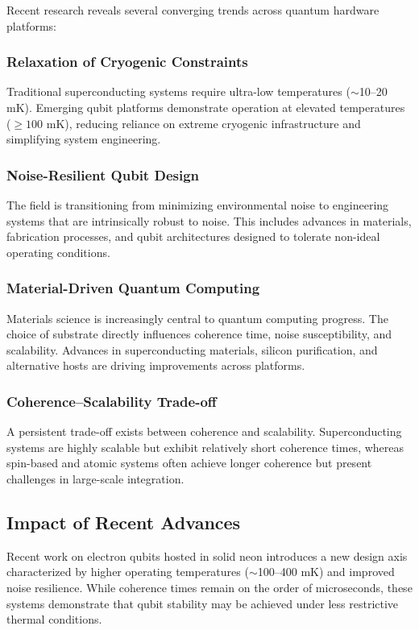\documentclass[11pt,a4paper]{article}
\begin{document}
Recent research reveals several converging trends across quantum hardware platforms\cite{arute2019,krantz2019}:

\subsubsection{Relaxation of Cryogenic Constraints}
Traditional superconducting systems require ultra-low temperatures ($\sim$10--20 mK). Emerging qubit platforms demonstrate operation at elevated temperatures ($\ge 100$ mK), reducing reliance on extreme cryogenic infrastructure and simplifying system engineering.

\subsubsection{Noise-Resilient Qubit Design}
The field is transitioning from minimizing environmental noise to engineering systems that are intrinsically robust to noise. This includes advances in materials, fabrication processes, and qubit architectures designed to tolerate non-ideal operating conditions.

\subsubsection{Material-Driven Quantum Computing}
Materials science is increasingly central to quantum computing progress. The choice of substrate directly influences coherence time, noise susceptibility, and scalability. Advances in superconducting materials, silicon purification, and alternative hosts are driving improvements across platforms.

\subsubsection{Coherence--Scalability Trade-off}
A persistent trade-off exists between coherence and scalability. Superconducting systems are highly scalable but exhibit relatively short coherence times, whereas spin-based and atomic systems often achieve longer coherence but present challenges in large-scale integration.

\subsection{Impact of Recent Advances}

Recent work on electron qubits hosted in solid neon introduces a new design axis characterized by higher operating temperatures ($\sim$100--400 mK) and improved noise resilience.\cite{neon2026} While coherence times remain on the order of microseconds, these systems demonstrate that qubit stability may be achieved under less restrictive thermal conditions.
\end{document}
